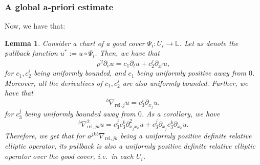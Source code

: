 \documentclass[10pt, a4paper]{article}
\theoremstyle{plain}%
\newtheorem{lem}[theorem]{Lemma}
\theoremstyle{definition}
\numberwithin{figure}{section}
\numberwithin{equation}{section}
\newcommand{\bL}{\mathbb{L}}
\newcommand{\pa}{\partial}
\newcommand{\rt}{\rightarrow}
\newcommand{\rel}{\mathrm{rel}}
\begin{document}
\subsubsection{A global a-priori estimate}

Now, we have that:
\begin{lem}\label{lem_chartsoperator}
	Consider a chart of a good cover $\Psi_i: U_i \rt \bL$. Let us denote the pullback function $u^*:=u\circ\Psi_i$. Then, we have that \[
	\rho^2\pa_v u = c_1\pa_tu + c^j_2\pa_{x^j}u,
	\]
	for $c_1,c^i_2$ being uniformly bounded, and $c_1$ being uniformly positive away from $0$. Moreover, all the derivatives of $c_1,c^j_2$ are also uniformly bounded. Further, we have that \[
	^b\nabla_{\rel,j}u = c_3^i\pa_{x_j}u,
	\]
	for $c_3^j$ being uniformly bounded away from $0$. As a corollary, we have \[
	^b\nabla^2_{\rel,jk}u = c_3^jc_3^k\pa^2_{x_jx_k}u + c_3^j\pa_{x_j}c^k_3\pa_{x_k}u.
	\]
	Therefore, we get that for $a^{jk}{^b\nabla_{\rel,jk}}$ being a uniformly positive definite relative elliptic operator, its pullback is also a uniformly positive definite relative elliptic operator over the good cover, i.e.\ in each $U_i$.
\end{lem}
\end{document}
